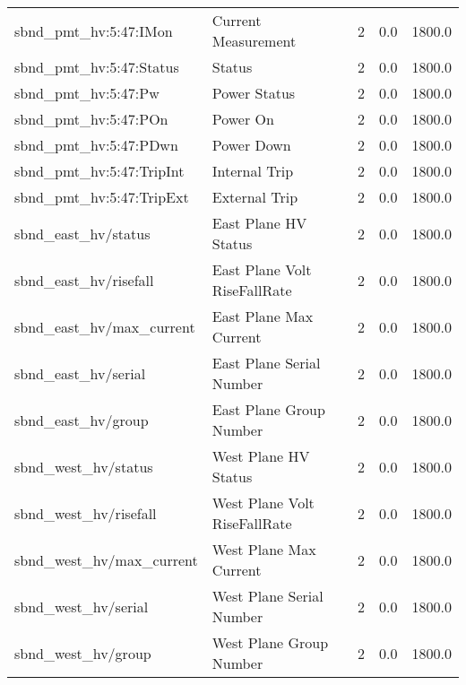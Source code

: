 \begin{center}
\begin{longtable}{l | l l l l }
sbnd\_pmt\_hv:5:47:IMon & Current Measurement & 2 & 0.0 & 1800.0\\ 
sbnd\_pmt\_hv:5:47:Status & Status & 2 & 0.0 & 1800.0\\ 
sbnd\_pmt\_hv:5:47:Pw & Power Status & 2 & 0.0 & 1800.0\\ 
sbnd\_pmt\_hv:5:47:POn & Power On & 2 & 0.0 & 1800.0\\ 
sbnd\_pmt\_hv:5:47:PDwn & Power Down & 2 & 0.0 & 1800.0\\ 
sbnd\_pmt\_hv:5:47:TripInt & Internal Trip & 2 & 0.0 & 1800.0\\ 
sbnd\_pmt\_hv:5:47:TripExt & External Trip & 2 & 0.0 & 1800.0\\ 
sbnd\_east\_hv/status & East Plane HV Status & 2 & 0.0 & 1800.0\\ 
sbnd\_east\_hv/risefall & East Plane Volt RiseFallRate & 2 & 0.0 & 1800.0\\ 
sbnd\_east\_hv/max\_current & East Plane Max Current & 2 & 0.0 & 1800.0\\ 
sbnd\_east\_hv/serial & East Plane Serial Number & 2 & 0.0 & 1800.0\\ 
sbnd\_east\_hv/group & East Plane Group Number & 2 & 0.0 & 1800.0\\ 
sbnd\_west\_hv/status & West Plane HV Status & 2 & 0.0 & 1800.0\\ 
sbnd\_west\_hv/risefall & West Plane Volt RiseFallRate & 2 & 0.0 & 1800.0\\ 
sbnd\_west\_hv/max\_current & West Plane Max Current & 2 & 0.0 & 1800.0\\ 
sbnd\_west\_hv/serial & West Plane Serial Number & 2 & 0.0 & 1800.0\\ 
sbnd\_west\_hv/group & West Plane Group Number & 2 & 0.0 & 1800.0\\ 

\hline
\end{longtable}
\end{center}


